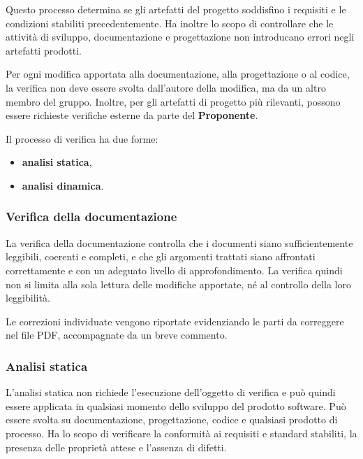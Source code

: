 \documentclass[12pt, a4paper]{article}
\begin{document}
Questo processo determina se gli artefatti del progetto soddisfino i requisiti e le condizioni stabiliti precedentemente. Ha inoltre lo scopo di controllare che le attività di sviluppo, documentazione e progettazione non introducano errori negli artefatti prodotti.

Per ogni modifica apportata alla documentazione, alla progettazione o al codice, la verifica non deve essere svolta dall'autore della modifica, ma da un altro membro del gruppo. Inoltre, per gli artefatti di progetto più rilevanti, possono essere richieste verifiche esterne da parte del \textbf{Proponente}.

Il processo di verifica ha due forme:
\begin{itemize}
    \item \textbf{analisi statica},
    \item \textbf{analisi dinamica}.
\end{itemize}

\subsubsection{Verifica della documentazione}

La verifica della documentazione controlla che i documenti siano sufficientemente leggibili, coerenti e completi, e che gli argomenti trattati siano affrontati correttamente e con un adeguato livello di approfondimento. La verifica quindi non si limita alla sola lettura delle modifiche apportate, né al controllo della loro leggibilità.

Le correzioni individuate vengono riportate evidenziando le parti da correggere nel file PDF, accompagnate da un breve commento.


\subsubsection{Analisi statica}

L'analisi statica non richiede l'esecuzione dell'oggetto di verifica e può quindi essere applicata in qualsiasi momento dello sviluppo del prodotto software. Può essere svolta su documentazione, progettazione, codice e qualsiasi prodotto di processo. Ha lo scopo di verificare la conformità ai requisiti e standard stabiliti, la presenza delle proprietà attese e l'assenza di difetti.
\end{document}
